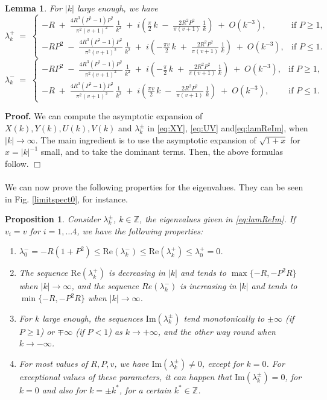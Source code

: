 \documentclass[a4paper]{article}
\newtheorem{lemma}[thm]{Lemma}
\newtheorem{prop}[thm]{Proposition}
\def\Re{{\textrm{Re}}}
\def\Im{{\textrm{Im}}}
\numberwithin{equation}{section}
\newenvironment{pf}{\vspace{0.5em}\noindent\textbf{Proof.} }{\quad \hfill $\Box$ \\ \vspace{0.2em}\\}
\begin{document}
\begin{lemma}\label{lem:lambdaasymp}
For $|k|$ large enough, we have
\[
\lambda_k^+
\;=\;
\begin{cases}
\displaystyle
-R
\;+\;
\frac{4R^3(P^2-1)P^2}{\pi^2 (v+1)^2}\,\frac{1}{k^2}
\;+\;
i\left(
\frac{\pi}{2}\,k
\;-\;
\frac{2R^2P^2}{\pi (v+1)}\,\frac{1}{k}
\right)
\;+\;
O(k^{-3}),
& \text{if } P \geq 1, \\[1.5em]
\displaystyle
-RP^2
\;-\;
\frac{4R^3(P^2-1)P^2}{\pi^2 (v+1)^2}\,\frac{1}{k^2}
\;+\;
i\left(
-\frac{\pi v}{2}\,k
\;+\;
\frac{2R^2P^2}{\pi (v+1)}\,\frac{1}{k}
\right)
\;+\;
O(k^{-3}),
& \text{if } P \leq 1.
\end{cases}
\]
\vspace{0.5em}
\[
\lambda_k^-
\;=\;
\begin{cases}
\displaystyle
- R P^2
\;-\;
\frac{4 R^3 (P^2 - 1) P^2}{\pi^2 (v+1)^2}\,\frac{1}{k^2}
\;+\;
i\left(
-\frac{\pi}{2}\,k
\;+\;
\frac{2 R^2 P^2}{\pi (v+1)}\,\frac{1}{k}
\right)
\;+\;
O(k^{-3}),
& \text{if } P \geq 1,
\\[1.5em]
\displaystyle
- R
\;+\;
\frac{4 R^3 (P^2-1) P^2}{\pi^2 (v+1)^2}\,\frac{1}{k^2}
\;+\;
i\left(
\frac{\pi v}{2}\,k
\;-\;
\frac{2 R^2 P^2}{\pi (v+1)}\,\frac{1}{k}
\right)
\;+\;
O(k^{-3}),
& \text{if } P \leq 1.
\end{cases}
\]
\end{lemma}
\begin{pf}
We can compute the asymptotic expansion of $X(k),Y(k), U(k), V(k)$ and $\lambda_k^{\pm}$ in \eqref{eq:XY}, \eqref{eq:UV} and\eqref{eq:lamReIm}, when $|k|\to\infty$. The main ingredient is to use the asymptotic expansion of $\sqrt{1+x}$ for $x=|k|^{-1}$ small, and to take the dominant terms. Then, the above formulas follow.
\end{pf}
We can now prove the following properties for the eigenvalues. They can be seen in Fig. \ref{limitspect0}, for instance.
\begin{prop}\label{prop:properties}
Consider $\lambda_k^{\pm}$, $k\in\mathbb{Z}$, the eigenvalues given in \eqref{eq:lamReIm}. If $v_i=v$ for $i=1,\ldots 4$, we have the following properties:
\begin{enumerate}
\item $\lambda_0^-=-R(1+P^2)\leq \Re(\lambda_k^-)\leq\Re(\lambda_k^+)\leq \lambda_0^+=0$.
\item The sequence $\Re(\lambda_k^+)$ is decreasing in $|k|$ and tends to $\max\{-R,-P^2R\}$ when $|k|\to\infty$, and the sequence $Re(\lambda_k^-)$ is increasing in $|k|$ and tends to $\min\{-R,-P^2R\}$ when $|k|\to\infty$.
\item For $k$ large enough, the sequences $\Im(\lambda_k^{\pm})$ tend monotonically to $\pm\infty$ (if $P\geq 1$) or $\mp\infty$ (if $P<1$) as $k\to +\infty$, and the other way round when $k\to -\infty$.
\item For most values of $R,P,v$, we have $\Im(\lambda_k^\pm)\ne 0$, except for $k=0$. For exceptional values of these parameters, it can happen that $\Im(\lambda_k^{\pm})=0$, for $k=0$ and also for $k=\pm k^*$, for a certain $k^*\in\mathbb{Z}$.
\end{enumerate}
\end{prop}
\end{document}
